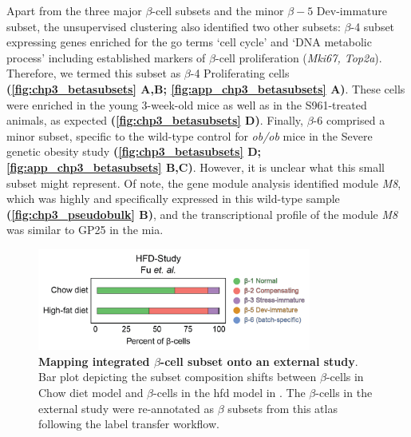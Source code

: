 \par Apart from the three major $\beta$-cell subsets and the minor $\beta-5$ Dev-immature subset, the unsupervised clustering also identified two other subsets: $\beta$-4 subset expressing genes enriched for the \gls{go} terms `cell cycle’ and `DNA metabolic process’ including established markers of $\beta$-cell proliferation (\textit{Mki67, Top2a}). Therefore, we termed this subset as $\beta$-4 Proliferating cells \textbf{(\autoref{fig:chp3_betasubsets} A,B; \autoref{fig:app_chp3_betasubsets} A)}. These cells were enriched in the young 3-week-old mice as well as in the S961-treated animals, as expected \textbf{(\autoref{fig:chp3_betasubsets} D)}. Finally, $\beta$-6 comprised a minor subset, specific to the wild-type control for \textit{ob/ob} mice in the Severe genetic obesity study \textbf{(\autoref{fig:chp3_betasubsets} D; \autoref{fig:app_chp3_betasubsets} B,C)}. However, it is unclear what this small subset might represent. Of note, the gene module analysis identified module \textit{M8}, which was highly and specifically expressed in this wild-type sample \textbf{(\autoref{fig:chp3_pseudobulk} B)}, and the transcriptional profile of the module \textit{M8} was similar to GP25 in the \gls{mia}.\\

\begin{figure}
\includegraphics[width=9cm]{Chapter5/Fig/F3-1-v2-04.png}
\caption[Mapping integrated $\beta$-cell subset onto an external  study]{\textbf{Mapping integrated $\beta$-cell subset onto an external  study}. Bar plot depicting the subset composition shifts between $\beta$-cells in Chow diet model and $\beta$-cells in the \gls{hfd} model in \textbf{\cite{fu_single-cell_2023}}. The $\beta$-cells in the external study were re-annotated as $\beta$ subsets from this atlas following the label transfer workflow.}
\vspace{-8pt}
\label{fig:chp3_hfdmapping}
\end{figure}


